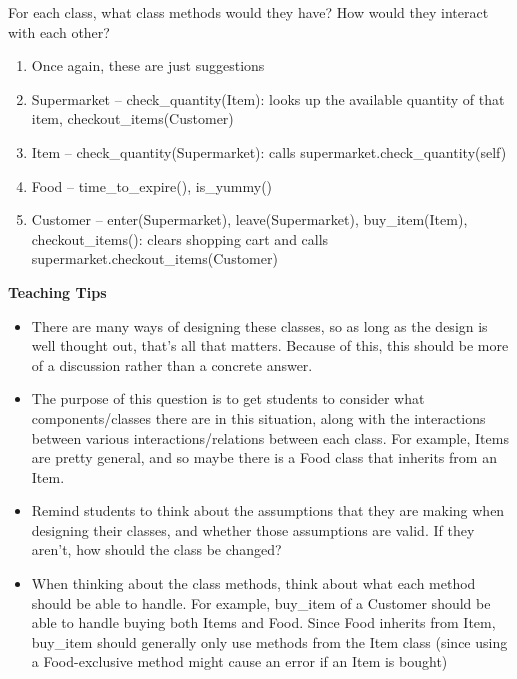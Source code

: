 \begin{blocksection}
\question For each class, what class methods would they have? How would they interact with each other?
\begin{solution}[1.5in]
\begin{enumerate}[1.]
\item Once again, these are just suggestions
\item Supermarket -- check\_quantity(Item): looks up the available quantity of that item, checkout\_items(Customer)
\item Item -- check\_quantity(Supermarket): calls supermarket.check\_quantity(self)
\item Food -- time\_to\_expire(), is\_yummy()
\item Customer -- enter(Supermarket), leave(Supermarket), buy\_item(Item), checkout\_items(): clears shopping cart and calls supermarket.checkout\_items(Customer)
\end{enumerate}
\end{solution}

\end{blocksection}

\begin{blocksection}
\begin{guide}
\textbf{Teaching Tips}
\begin{itemize}
    \item There are many ways of designing these classes, so as long as the design is well thought out, that's all that matters. Because of this, this should be more of a discussion rather than a concrete answer.
    \item The purpose of this question is to get students to consider what components/classes there are in this situation, along with the interactions between various interactions/relations between each class. For example, Items are pretty general, and so maybe there is a Food class that inherits from an Item.
    \item Remind students to think about the assumptions that they are making when designing their classes, and whether those assumptions are valid. If they aren't, how should the class be changed?
    \item When thinking about the class methods, think about what each method should be able to handle. For example, buy\_item of a Customer should be able to handle buying both Items and Food. Since Food inherits from Item, buy\_item should generally only use methods from the Item class (since using a Food-exclusive method might cause an error if an Item is bought)
\end{itemize}
\end{guide}
\end{blocksection}